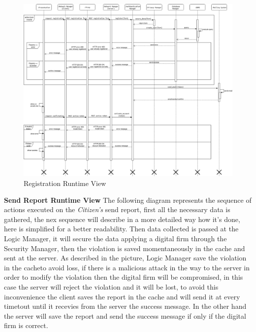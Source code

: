 \documentclass{article}
\begin{document}
\begin{figure}[H]
    \centering
    \includegraphics[scale=0.4]{img/sequence_diagrams/registration_sequence.png}
    \caption{Registration Runtime View}
\end{figure}  

\textbf{Send Report Runtime View}
The following diagram represents the sequence of actions executed on the \textit{Citizen's} send report, 
first all the necessary data is gathered, the nex sequence will describe in a more detailed way how it's 
done, here is simplified for a better readability. Then data collected is passed at the Logic Manager, 
it will secure the data applying a digital firm through the Security Manager, then the violation is 
saved momentaneously in the cache and sent at the server. As described in the picture, Logic Manager 
save the violation in the cacheto avoid loss, if there is a malicious attack in the way to the server 
in order to modify the violation then the digital firm will be compromised, in this case the server 
will reject the violation and it will be lost, to avoid this inconvenience the client saves the report 
in the cache and will send it at every timetout until it recevies from the server the success message. 
In the other hand the server will save the report and send the success message if only if the digital 
firm is correct. 
\end{document}
